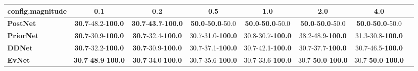 \begin{tabular}{lccccccc}
\toprule
\textbf{config.magnitude} &                                         0.1 &                                         0.2 &                               0.5 &                               1.0 &                                2.0 &                                4.0 \\
\midrule
\textbf{PostNet } &           \textbf{30.7}-48.2-\textbf{100.0} &  \textbf{30.7}-\textbf{43.7}-\textbf{100.0} &  \textbf{50.0}-\textbf{50.0}-50.0 &  \textbf{50.0}-\textbf{50.0}-50.0 &   \textbf{50.0}-\textbf{50.0}-50.0 &   \textbf{50.0}-\textbf{50.0}-50.0 \\
\textbf{PriorNet} &           \textbf{30.7}-30.9-\textbf{100.0} &           \textbf{30.7}-32.4-\textbf{100.0} &          30.7-31.0-\textbf{100.0} &          30.8-30.7-\textbf{100.0} &           38.2-48.9-\textbf{100.0} &           31.3-30.8-\textbf{100.0} \\
\textbf{DDNet   } &           \textbf{30.7}-32.2-\textbf{100.0} &           \textbf{30.7}-30.9-\textbf{100.0} &          30.7-37.1-\textbf{100.0} &          30.7-42.1-\textbf{100.0} &           30.7-37.7-\textbf{100.0} &           30.7-46.5-\textbf{100.0} \\
\textbf{EvNet   } &  \textbf{30.7}-\textbf{48.9}-\textbf{100.0} &           \textbf{30.7}-34.0-\textbf{100.0} &          30.7-35.6-\textbf{100.0} &          30.7-33.6-\textbf{100.0} &  30.7-\textbf{50.0}-\textbf{100.0} &  30.7-\textbf{50.0}-\textbf{100.0} \\
\bottomrule
\end{tabular}
